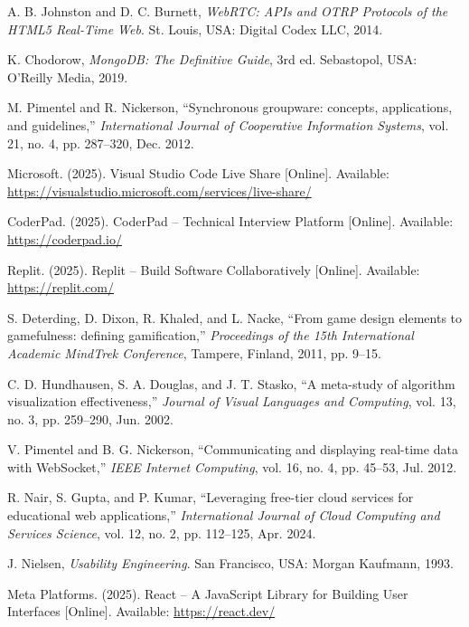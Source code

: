 \begin{enumerate}[label={[\arabic*]}, leftmargin=1.5cm, labelsep=0.5cm, itemsep=0.3cm]
\item A. B. Johnston and D. C. Burnett, \textit{WebRTC: APIs and OTRP Protocols of the HTML5 Real-Time Web}. St. Louis, USA: Digital Codex LLC, 2014.

\item K. Chodorow, \textit{MongoDB: The Definitive Guide}, 3rd ed. Sebastopol, USA: O'Reilly Media, 2019.

\item M. Pimentel and R. Nickerson, ``Synchronous groupware: concepts, applications, and guidelines,'' \textit{International Journal of Cooperative Information Systems}, vol. 21, no. 4, pp. 287--320, Dec. 2012.

\item Microsoft. (2025). Visual Studio Code Live Share [Online]. Available: \url{https://visualstudio.microsoft.com/services/live-share/}

\item CoderPad. (2025). CoderPad -- Technical Interview Platform [Online]. Available: \url{https://coderpad.io/}

\item Replit. (2025). Replit -- Build Software Collaboratively [Online]. Available: \url{https://replit.com/}

\item S. Deterding, D. Dixon, R. Khaled, and L. Nacke, ``From game design elements to gamefulness: defining gamification,'' \textit{Proceedings of the 15th International Academic MindTrek Conference}, Tampere, Finland, 2011, pp. 9--15.

\item C. D. Hundhausen, S. A. Douglas, and J. T. Stasko, ``A meta-study of algorithm visualization effectiveness,'' \textit{Journal of Visual Languages and Computing}, vol. 13, no. 3, pp. 259--290, Jun. 2002.

\item V. Pimentel and B. G. Nickerson, ``Communicating and displaying real-time data with WebSocket,'' \textit{IEEE Internet Computing}, vol. 16, no. 4, pp. 45--53, Jul. 2012.

\item R. Nair, S. Gupta, and P. Kumar, ``Leveraging free-tier cloud services for educational web applications,'' \textit{International Journal of Cloud Computing and Services Science}, vol. 12, no. 2, pp. 112--125, Apr. 2024.

\item J. Nielsen, \textit{Usability Engineering}. San Francisco, USA: Morgan Kaufmann, 1993.

\item Meta Platforms. (2025). React -- A JavaScript Library for Building User Interfaces [Online]. Available: \url{https://react.dev/}

\end{enumerate}
